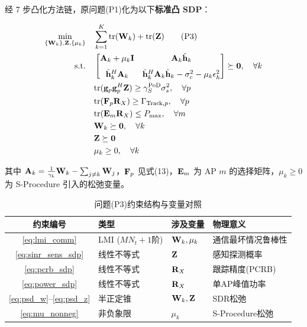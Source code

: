 经 7 步凸化方法链，原问题(P1)化为以下\textbf{标准凸 SDP}：

\begin{align}
\min_{\{\mathbf{W}_k\}, \mathbf{Z}, \{\mu_k\}} \quad & \sum_{k=1}^K \text{tr}(\mathbf{W}_k) + \text{tr}(\mathbf{Z}) \tag{P3} \\
\text{s.t.} \quad & \begin{bmatrix} \mathbf{A}_k + \mu_k \mathbf{I} & \mathbf{A}_k \hat{\mathbf{h}}_k \\[1.5ex] \hat{\mathbf{h}}_k^H \mathbf{A}_k & \hat{\mathbf{h}}_k^H \mathbf{A}_k \hat{\mathbf{h}}_k - \sigma_c^2 - \mu_k \epsilon_h^2 \end{bmatrix} \succeq \mathbf{0}, \quad \forall k \label{eq:lmi_comm} \\
& \text{tr}(\mathbf{g}_p \mathbf{g}_p^H \mathbf{Z}) \geq \gamma_S^{\text{PoD}} \sigma_s^2, \quad \forall p \label{eq:sinr_sens_sdp} \\
& \text{tr}(\mathbf{F}_p \mathbf{R}_X) \geq \Gamma_{\text{Track},p}, \quad \forall p \label{eq:pcrb_sdp} \\
& \text{tr}(\mathbf{E}_m \mathbf{R}_X) \leq P_{\max}, \quad \forall m \label{eq:power_sdp} \\
& \mathbf{W}_k \succeq \mathbf{0}, \quad \forall k \label{eq:psd_w} \\
& \mathbf{Z} \succeq \mathbf{0} \label{eq:psd_z} \\
& \mu_k \geq 0, \quad \forall k \label{eq:mu_nonneg}
\end{align}

其中 $\mathbf{A}_k = \frac{1}{\gamma_k} \mathbf{W}_k - \sum_{j \neq k} \mathbf{W}_j$，$\mathbf{F}_p$ 见式(13)，$\mathbf{E}_m$ 为 AP $m$ 的选择矩阵，$\mu_k \geq 0$ 为 S-Procedure 引入的松弛变量。

\begin{table}[htbp]
\centering
\caption{问题(P3)约束结构与变量对照}\label{tab:p3_structure}
\begin{tabular}{clll}
\toprule
约束编号 & 类型 & 涉及变量 & 物理意义 \\
\midrule
\eqref{eq:lmi_comm} & LMI ($MN_t+1$阶) & $\mathbf{W}_k, \mu_k$ & 通信最坏情况鲁棒性 \\
\eqref{eq:sinr_sens_sdp} & 线性不等式 & $\mathbf{Z}$ & 感知探测概率 \\
\eqref{eq:pcrb_sdp} & 线性不等式 & $\mathbf{R}_X$ & 跟踪精度(PCRB) \\
\eqref{eq:power_sdp} & 线性不等式 & $\mathbf{R}_X$ & 单AP峰值功率 \\
\eqref{eq:psd_w}--\eqref{eq:psd_z} & 半正定锥 & $\mathbf{W}_k, \mathbf{Z}$ & SDR松弛 \\
\eqref{eq:mu_nonneg} & 非负象限 & $\mu_k$ & S-Procedure松弛 \\
\bottomrule
\end{tabular}
\end{table}

